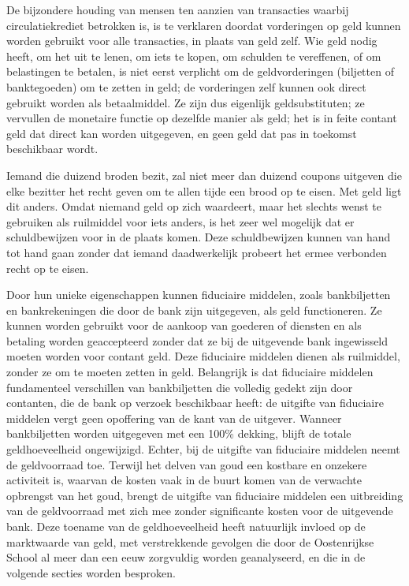 \begin{blockquotebox}
    De bijzondere houding van mensen ten aanzien van transacties waarbij circulatiekrediet betrokken is, is te verklaren doordat vorderingen op geld kunnen worden gebruikt voor alle transacties, in plaats van geld zelf. Wie geld nodig heeft, om het uit te lenen, om iets te kopen, om schulden te vereffenen, of om belastingen te betalen, is niet eerst verplicht om de geldvorderingen (biljetten of banktegoeden) om te zetten in geld; de vorderingen zelf kunnen ook direct gebruikt worden als betaalmiddel. Ze zijn dus eigenlijk geldsubstituten; ze vervullen de monetaire functie op dezelfde manier als geld; het is in feite contant geld dat direct kan worden uitgegeven, en geen geld dat pas in toekomst beschikbaar wordt.
    \par\vspace{1em}\noindent
    Iemand die duizend broden bezit, zal niet meer dan duizend coupons uitgeven die elke bezitter het recht geven om te allen tijde een brood op te eisen. Met geld ligt dit anders. Omdat niemand geld op zich waardeert, maar het slechts wenst te gebruiken als ruilmiddel voor iets anders, is het zeer wel mogelijk dat er schuldbewijzen voor in de plaats komen. Deze schuldbewijzen kunnen van hand tot hand gaan zonder dat iemand daadwerkelijk probeert het ermee verbonden recht op te eisen.\footnotemark
\end{blockquotebox}

Door hun unieke eigenschappen kunnen fiduciaire middelen, zoals bankbiljetten en bankrekeningen die door de bank zijn uitgegeven, als geld functioneren. Ze kunnen worden gebruikt voor de aankoop van goederen of diensten en als betaling worden geaccepteerd zonder dat ze bij de uitgevende bank ingewisseld moeten worden voor contant geld. Deze fiduciaire middelen dienen als ruilmiddel, zonder ze om te moeten zetten in geld. Belangrijk is dat fiduciaire middelen fundamenteel verschillen van bankbiljetten die volledig gedekt zijn door contanten, die de bank op verzoek beschikbaar heeft: de uitgifte van fiduciaire middelen vergt geen opoffering van de kant van de uitgever. Wanneer bankbiljetten worden uitgegeven met een 100\% dekking, blijft de totale geldhoeveelheid ongewijzigd. Echter, bij de uitgifte van fiduciaire middelen neemt de geldvoorraad toe. Terwijl het delven van goud een kostbare en onzekere activiteit is, waarvan de kosten vaak in de buurt komen van de verwachte opbrengst van het goud, brengt de uitgifte van fiduciaire middelen een uitbreiding van de geldvoorraad met zich mee zonder significante kosten voor de uitgevende bank. Deze toename van de geldhoeveelheid heeft natuurlijk invloed op de marktwaarde van geld, met verstrekkende gevolgen die door de Oostenrijkse School al meer dan een eeuw zorgvuldig worden geanalyseerd, en die in de volgende secties worden besproken.

